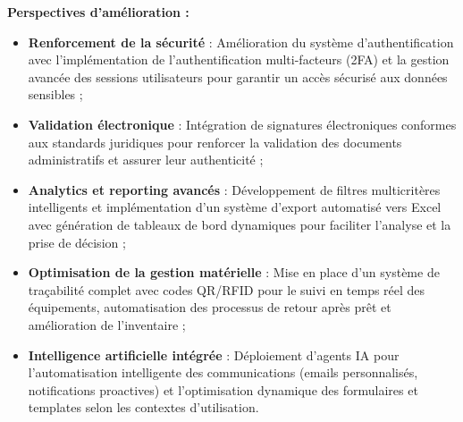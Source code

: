 \textbf{Perspectives d’amélioration :}
\begin{itemize}
  \item \textbf{Renforcement de la sécurité} : Amélioration du système d'authentification avec l'implémentation de l'authentification multi-facteurs (2FA) et la gestion avancée des sessions utilisateurs pour garantir un accès sécurisé aux données sensibles ;
  
  \item \textbf{Validation électronique} : Intégration de signatures électroniques conformes aux standards juridiques pour renforcer la validation des documents administratifs et assurer leur authenticité ;
  
  \item \textbf{Analytics et reporting avancés} : Développement de filtres multicritères intelligents et implémentation d'un système d'export automatisé vers Excel avec génération de tableaux de bord dynamiques pour faciliter l'analyse et la prise de décision ;
  
  \item \textbf{Optimisation de la gestion matérielle} : Mise en place d'un système de traçabilité complet avec codes QR/RFID pour le suivi en temps réel des équipements, automatisation des processus de retour après prêt et amélioration de l'inventaire ;
  
  \item \textbf{Intelligence artificielle intégrée} : Déploiement d'agents IA pour l'automatisation intelligente des communications (emails personnalisés, notifications proactives) et l'optimisation dynamique des formulaires et templates selon les contextes d'utilisation.
 \end{itemize}

